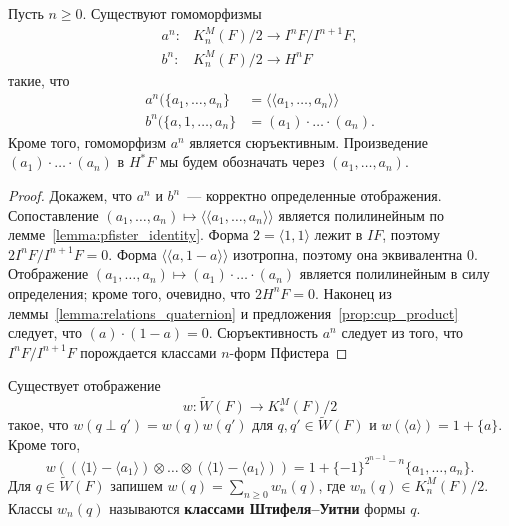 \documentclass[a4paper,oneside,12pt]{article}
\theoremstyle{plain} { \swapnumbers
\newtheorem{theorem}{Теорема}[subsection]
\newtheorem{corollary}[theorem]{Следствие}
\newtheorem{lemma}[theorem]{Лемма}
\newtheorem{proposition}[theorem]{Утверждение}
\newtheorem{claim}[theorem]{Факт}
}
\theoremstyle{definition} { \swapnumbers
\newtheorem{definition}[theorem]{Определение}
\newtheorem{notation}[theorem]{Обозначение}
\newtheorem{remark}[theorem]{Замечание}
\newtheorem{remarks}[theorem]{Замечания}
\newtheorem{example}[theorem]{Пример}
\newtheorem{examples}[theorem]{Примеры}
\newtheorem{sssection}[theorem]{}
}
\def\tilde{\widetilde}
\def\la{\langle}
\def\ra{\rangle}
\def\lla{\la\!\la}
\def\rra{\ra\!\ra}
\begin{document}
\begin{proposition}
Пусть $n\geq 0$. Существуют гомоморфизмы
$$
\begin{aligned}
a^n\colon & K_n^M(F)/2\to I^nF/I^{n+1}F,\\
b^n\colon & K_n^M(F)/2\to H^nF
\end{aligned}
$$
такие, что
$$
\begin{aligned}
a^n(\{a_1,\dots,a_n\}&=\lla a_1,\dots,a_n\rra\\
b^n(\{a,1,\dots,a_n\}&=(a_1)\cdot\dots\cdot(a_n).
\end{aligned}
$$
Кроме того, гомоморфизм $a^n$ является сюръективным.
Произведение $(a_1)\cdot\dots\cdot(a_n)$ в $H^*F$ мы будем обозначать через $(a_1,\dots,a_n)$.
\end{proposition}
\begin{proof}
Докажем, что $a^n$ и $b^n$~--- корректно определенные отображения.
Сопоставление
$(a_1,\dots,a_n)\mapsto\lla a_1,\dots,a_n\rra$ является полилинейным
по лемме~\ref{lemma:pfister_identity}. Форма $2=\la 1,1\ra$ лежит
в $IF$, поэтому $2I^nF/I^{n+1}F=0$. Форма $\lla a,1-a\rra$ изотропна,
поэтому она эквивалентна 0.
Отображение
$(a_1,\dots,a_n)\mapsto(a_1)\cdot\dots\cdot(a_n)$ является полилинейным
в силу определения; кроме того, очевидно, что $2H^nF=0$. Наконец
из леммы~\ref{lemma:relations_quaternion} и предложения~\ref{prop:cup_product}
следует, что $(a)\cdot(1-a)=0$.
Сюръективность $a^n$ следует из того, что $I^nF/I^{n+1}F$ порождается
классами $n$-форм Пфистера
\end{proof}

\begin{proposition}[Милнор]
Существует отображение
$$
w\colon \tilde W(F)\to K_*^M(F)/2
$$
такое, что $w(q\perp q')=w(q)w(q')$ для $q,q'\in\tilde W(F)$ и $w(\la a\ra)=1+\{a\}$.
Кроме того,
$$
w((\la 1\ra-\la a_1\ra)\otimes\dots\otimes(\la 1\ra-\la a_1\ra))=1+\{-1\}^{2^{n-1}-n}\{a_1,\dots,a_n\}.
$$
Для $q\in\tilde W(F)$ запишем $w(q)=\sum_{n\geq 0}w_n(q)$, где $w_n(q)\in K_n^M(F)/2$. Классы
$w_n(q)$ называются {\bf классами Штифеля--Уитни} формы $q$.
\end{proposition}
\end{document}
